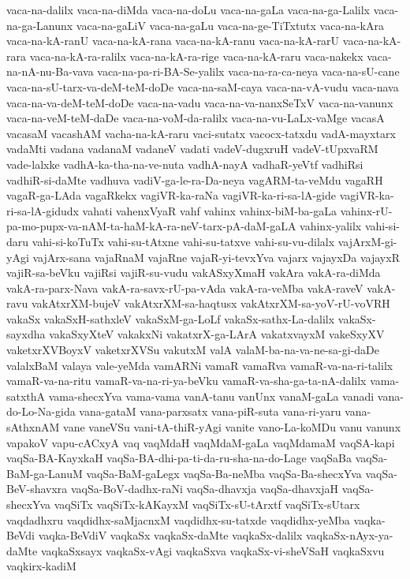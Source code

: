 {vaca-na-dalilx
vaca-na-diMda
vaca-na-doLu
vaca-na-gaLa
vaca-na-ga-Lalilx
vaca-na-ga-Lanunx
vaca-na-gaLiV
vaca-na-gaLu
vaca-na-ge-TiTxtutx
vaca-na-kAra
vaca-na-kA-ranU
vaca-na-kA-rana
vaca-na-kA-ranu
vaca-na-kA-rarU
vaca-na-kA-rara
vaca-na-kA-ra-ralilx
vaca-na-kA-ra-rige
vaca-na-kA-raru
vaca-nakekx
vaca-na-nA-nu-Ba-vava
vaca-na-pa-ri-BA-Se-yalilx
vaca-na-ra-ca-neya
vaca-na-sU-cane
vaca-na-sU-tarx-va-deM-teM-doDe
vaca-na-saM-caya
vaca-na-vA-vudu
vaca-nava
vaca-na-va-deM-teM-doDe
vaca-na-vadu
vaca-na-va-nanxSeTxV
vaca-na-vanunx
vaca-na-veM-teM-daDe
vaca-na-voM-da-ralilx
vaca-na-vu-LaLx-vaMge
vacasA
vacasaM
vacashAM
vacha-na-kA-raru
vaci-sutatx
vacocx-tatxdu
vadA-mayxtarx
vadaMti
vadana
vadanaM
vadaneV
vadati
vadeV-dugxruH
vadeV-tUpxvaRM
vade-lalxke
vadhA-ka-tha-na-ve-nuta
vadhA-nayA
vadhaR-yeVtf
vadhiRsi
vadhiR-si-daMte
vadhuva
vadiV-ga-le-ra-Da-neya
vagARM-ta-veMdu
vagaRH
vagaR-ga-LAda
vagaRkekx
vagiVR-ka-raNa
vagiVR-ka-ri-sa-lA-gide
vagiVR-ka-ri-sa-lA-gidudx
vahati
vahenxVyaR
vahf
vahinx
vahinx-biM-ba-gaLa
vahinx-rU-pa-mo-pupx-va-nAM-ta-haM-kA-ra-neV-tarx-pA-daM-gaLA
vahinx-yalilx
vahi-si-daru
vahi-si-koTuTx
vahi-su-tAtxne
vahi-su-tatxve
vahi-su-vu-dilalx
vajArxM-gi-yAgi
vajArx-sana
vajaRnaM
vajaRne
vajaR-yi-tevxYva
vajarx
vajayxDa
vajayxR
vajiR-sa-beVku
vajiRsi
vajiR-su-vudu
vakASxyXmaH
vakAra
vakA-ra-diMda
vakA-ra-parx-Nava
vakA-ra-savx-rU-pa-vAda
vakA-ra-veMba
vakA-raveV
vakA-ravu
vakAtxrXM-bujeV
vakAtxrXM-sa-haqtusx
vakAtxrXM-sa-yoV-rU-voVRH
vakaSx
vakaSxH-sathxleV
vakaSxM-ga-LoLf
vakaSx-sathx-La-dalilx
vakaSx-sayxdha
vakaSxyXteV
vakakxNi
vakatxrX-ga-LArA
vakatxvayxM
vakeSxyXV
vaketxrXVBoyxV
vaketxrXVSu
vakutxM
valA
valaM-ba-na-va-ne-sa-gi-daDe
valalxBaM
valaya
vale-yeMda
vamARNi
vamaR
vamaRva
vamaR-va-na-ri-talilx
vamaR-va-na-ritu
vamaR-va-na-ri-ya-beVku
vamaR-va-sha-ga-ta-nA-dalilx
vama-satxthA
vama-shecxYva
vama-vama
vanA-tanu
vanUnx
vanaM-gaLa
vanadi
vana-do-Lo-Na-gida
vana-gataM
vana-parxsatx
vana-piR-suta
vana-ri-yaru
vana-sAthxnAM
vane
vaneVSu
vani-tA-thiR-yAgi
vanite
vano-La-koMDu
vanu
vanunx
vapakoV
vapu-cACxyA
vaq
vaqMdaH
vaqMdaM-gaLa
vaqMdamaM
vaqSA-kapi
vaqSa-BA-KayxkaH
vaqSa-BA-dhi-pa-ti-da-ru-sha-na-do-Lage
vaqSaBa
vaqSa-BaM-ga-LanuM
vaqSa-BaM-gaLegx
vaqSa-Ba-neMba
vaqSa-Ba-shecxYva
vaqSa-BeV-shavxra
vaqSa-BoV-dadhx-raNi
vaqSa-dhavxja
vaqSa-dhavxjaH
vaqSa-shecxYva
vaqSiTx
vaqSiTx-kAKayxM
vaqSiTx-sU-tArxtf
vaqSiTx-sUtarx
vaqdadhxru
vaqdidhx-saMjacnxM
vaqdidhx-su-tatxde
vaqdidhx-yeMba
vaqka-BeVdi
vaqka-BeVdiV
vaqkaSx
vaqkaSx-daMte
vaqkaSx-dalilx
vaqkaSx-nAyx-ya-daMte
vaqkaSxsayx
vaqkaSx-vAgi
vaqkaSxva
vaqkaSx-vi-sheVSaH
vaqkaSxvu
vaqkirx-kadiM
}
